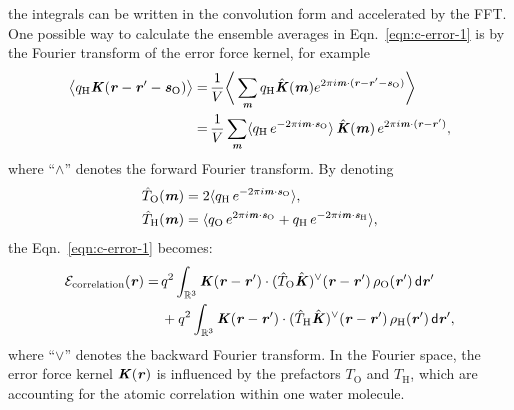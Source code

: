 \documentclass[aps,pre,preprint,unsortedaddress]{revtex4}
\renewcommand{\v}[1]{\textbf{\textit{#1}}}
\renewcommand{\d}[1]{\textsf{#1}}
\begin{document}
the integrals can be written in the convolution form and accelerated by the FFT.
One possible way to calculate the ensemble averages in
Eqn.~\eqref{eqn:c-error-1} is by the Fourier transform
of the error force kernel, for example
\begin{align} \nonumber
  \big\langle
  q_{\textrm{H}}\v K(\v r - \v r' - \v s_{\textrm{O}})
  \big\rangle 
  =\,&
  \frac1V\bigg\langle
  \sum_{\v m}
  q_{\textrm{H}}\hat{\v K}(\v m)
  e^{2\pi i\v m\cdot(\v r - \v r' - \v s_{\textrm{O}})} 
  \bigg\rangle \\\nonumber
  =\,&
  \frac1V\sum_{\v m}
  \langle
  q_{\textrm{H}}\,e^{-2\pi i\v m\cdot\v s_{\textrm{O}}}
  \rangle\,
  \hat{\v K}(\v m)\,
  e^{2\pi i\v m\cdot(\v r - \v r')},
\end{align}
where ``$\wedge$'' denotes the forward Fourier transform. By denoting
\begin{align}
  \hat T_{\textrm{O}}(\v m)
  &= 
  2\langle
  q_{\textrm{H}}\,e^{-2\pi i\v m\cdot\v s_{\textrm{O}}}
  \rangle,\\
  \hat T_{\textrm{H}}(\v m)
  &= 
  \langle
  q_{\textrm{O}}\,e^{2\pi i\v m\cdot\v s_{\textrm{O}}} +
  q_{\textrm{H}}\,e^{-2\pi i\v m\cdot\v s_{\textrm{H}}}
  \rangle,
\end{align}
the Eqn.~\eqref{eqn:c-error-1} becomes:
\begin{align}\nonumber
  \mathcal E_{\textrm{correlation}}(\v r)
  =&\,
  q^2
  \int_{\mathbb R^3}
  \v K(\v r - \v r')\cdot
  (\hat T_{\textrm{O}}\hat{\v K})^{\vee}(\v r - \v r')
  \,\rho_{\textrm{O}}(\v r')
  \,\d d\v r' \\\label{eqn:c-error-water}
  & \,+
  q^2
  \int_{\mathbb R^3}
  \v K(\v r - \v r')\cdot
  (\hat T_{\textrm{H}}\hat{\v K})^{\vee}(\v r - \v r')
  \,\rho_{\textrm{H}}(\v r')
  \,\d d\v r',
\end{align}
where ``$\vee$'' denotes the backward Fourier transform.
In the Fourier space, the error force kernel $\v K(\v r)$ is
influenced by the prefactors $T_{\textrm{O}}$ and $T_{\textrm{H}}$,
which are accounting for the atomic correlation within one water
molecule.
\end{document}
